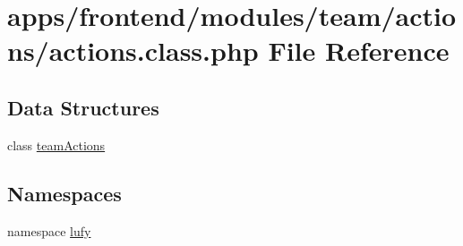 \hypertarget{actions_8class_8php}{\section{apps/frontend/modules/team/actions/actions.class.\-php File Reference}
\label{actions_8class_8php}
}
\subsection*{Data Structures}
\begin{DoxyCompactItemize}
\item 
class \hyperlink{classteam_actions}{team\-Actions}
\end{DoxyCompactItemize}
\subsection*{Namespaces}
\begin{DoxyCompactItemize}
\item 
namespace \hyperlink{namespacelufy}{lufy}
\end{DoxyCompactItemize}
